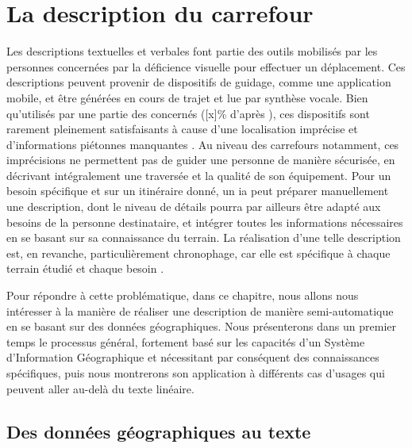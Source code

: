 \chapter{La description du carrefour}

\label{chap:description}



Les descriptions textuelles et verbales font partie des outils mobilisés par les personnes concernées par la déficience visuelle pour effectuer un déplacement. Ces descriptions peuvent provenir de dispositifs de guidage, comme une application mobile, et être générées en cours de trajet et lue par synthèse vocale. Bien qu’utilisés par une partie des concernés ([x]\% d’après \cite{homere_2023}), ces dispositifs sont rarement pleinement satisfaisants à cause d’une localisation imprécise et d’informations piétonnes manquantes \missref{}. Au niveau des carrefours notamment, ces imprécisions ne permettent pas de guider une personne de manière sécurisée, en décrivant intégralement une traversée et la qualité de son équipement. Pour un besoin spécifique et sur un itinéraire donné, un \gls{ia} peut préparer manuellement une description, dont le niveau de détails pourra par ailleurs être adapté aux besoins de la personne destinataire, et intégrer toutes les informations nécessaires en se basant sur sa connaissance du terrain. La réalisation d’une telle description est, en revanche, particulièrement chronophage, car elle est spécifique à chaque terrain étudié et chaque besoin \missref{}.

\newpar{}

Pour répondre à cette problématique, dans ce chapitre, nous allons nous intéresser à la manière de réaliser une description de manière semi-automatique en se basant sur des données géographiques. Nous présenterons dans un premier temps le processus général, fortement basé sur les capacités d’un Système d’Information Géographique et nécessitant par conséquent des connaissances spécifiques, puis nous montrerons son application à différents cas d’usages qui peuvent aller au-delà du texte linéaire.


\section{Des données géographiques au texte}

